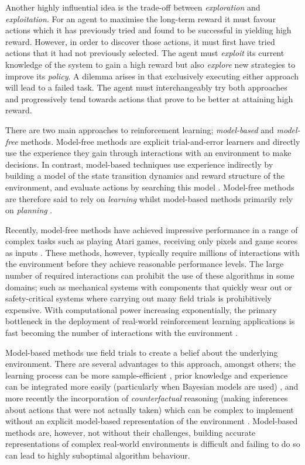 Another highly influential idea is the trade-off between \textit{exploration} and \textit{exploitation}. For an agent to maximise the long-term reward it must favour actions which it has previously tried and found to be successful in yielding high reward. However, in order to discover those actions, it must first have tried actions that it had not previously selected. The agent must \textit{exploit} its current knowledge of the system to gain a high reward but also \textit{explore} new strategies to improve its \textit{policy}. A dilemma arises in that exclusively executing either approach will lead to a failed task. The agent must interchangeably try both approaches and progressively tend towards actions that prove to be better at attaining high reward.

There are two main approaches to reinforcement learning; \textit{model-based} and \textit{model-free} methods. Model-free methods are explicit trial-and-error learners and directly use the experience they gain through interactions with an environment to make decisions. In contrast, model-based techniques use experience indirectly by building a model of the state transition dynamics and reward structure of the environment, and evaluate actions by searching this model \citep{glascher2010states}. Model-free methods are therefore said to rely on \textit{learning} whilst model-based methods primarily  rely on \textit{planning} \citep{sutton2018reinforcement}. 

Recently, model-free methods have achieved impressive performance in a range of complex tasks such as playing Atari games, receiving only pixels and game scores as inputs \citep{mnih2015human}. These methods, however, typically require millions of interactions with the environment before they achieve reasonable performance levels. The large number of required interactions can prohibit the use of these algorithms in some domains; such as mechanical systems with components that quickly wear out \citep{deisenroth2011pilco} or safety-critical systems where carrying out many field trials is prohibitively expensive. With computational power increasing exponentially, the primary bottleneck in the deployment of real-world reinforcement learning applications is fast becoming the number of interactions with the environment \citep{Wan2018ModelbasedRL}.

Model-based methods use field trials to create a belief about the underlying environment. There are several advantages to this approach, amongst others; the learning process can be more sample-efficient \citep{deisenroth2013gaussian}, prior knowledge and experience can be integrated more easily (particularly when Bayesian models are used) \citep{lopes2012exploration}, and more recently the incorporation of \textit{counterfactual} reasoning (making inferences about actions that were not actually taken) which can be complex to implement without an explicit model-based representation of the environment \citep{buesing2018woulda}. Model-based methods are, however, not without their challenges, building accurate representations of complex real-world environments is difficult and failing to do so can lead to highly suboptimal algorithm behaviour.

